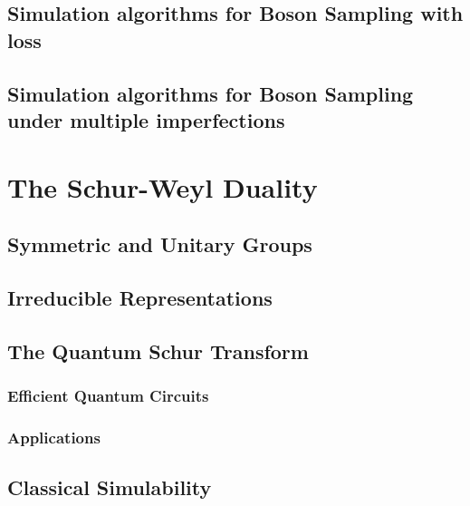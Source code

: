 \subsection{Simulation algorithms for Boson Sampling with loss}

\subsection{Simulation algorithms for Boson Sampling under multiple imperfections}

\section{The Schur-Weyl Duality}

\subsection{Symmetric and Unitary Groups}

\subsection{Irreducible Representations}

\subsection{The Quantum Schur Transform}

\subsubsection{Efficient Quantum Circuits}

\subsubsection{Applications}

\subsection{Classical Simulability}